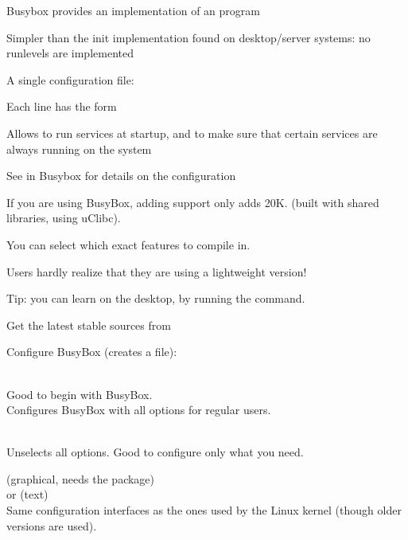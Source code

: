   \startitemize
  \item Busybox provides an implementation of an  program
  \item Simpler than the init implementation found on desktop/server
    systems: no runlevels are implemented
  \item A single configuration file: 
    \startitemize
    \item Each line has the form 
    \stopitemize
  \item Allows to run services at startup, and to make sure that
    certain services are always running on the system
  \item See  in Busybox for details on the
    configuration
  \stopitemize

  \startitemize
  \item If you are using BusyBox, adding  support only adds
    20K. (built with shared libraries, using uClibc).
  \item You can select which exact features to compile in.
  \item Users hardly realize that they are using a lightweight 
    version!
  \item Tip: you can learn  on the desktop, by running the 
    command.
  \stopitemize

  \startitemize
  \item Get the latest stable sources from 
  \item Configure BusyBox (creates a  file):
    \startitemize
    \item {}\\
      Good to begin with BusyBox.\\
      Configures BusyBox with all options for regular users.
    \item {}\\
      Unselects all options. Good to configure only what you need.
    \stopitemize
  \item {} (graphical, needs the  package)\\
    or  (text)\\
    Same configuration interfaces as the ones used by the Linux kernel
    (though older versions are used).
  \stopitemize

